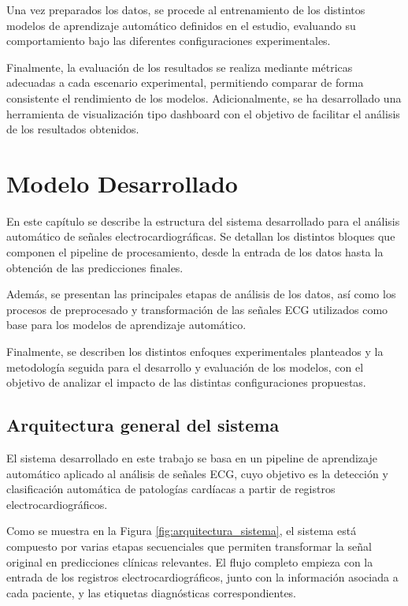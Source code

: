 \documentclass[12pt,a4paper,twoside]{book}
\begin{document}
Una vez preparados los datos, se procede al entrenamiento de los distintos modelos de aprendizaje automático definidos en el estudio, evaluando su comportamiento bajo las diferentes configuraciones experimentales.

Finalmente, la evaluación de los resultados se realiza mediante métricas adecuadas a cada escenario experimental, permitiendo comparar de forma consistente el rendimiento de los modelos. 
Adicionalmente, se ha desarrollado una herramienta de visualización tipo dashboard con el objetivo de facilitar el análisis de los resultados obtenidos. 


\chapter{Modelo Desarrollado}

En este capítulo se describe la estructura del sistema desarrollado para el análisis automático de señales electrocardiográficas. 
Se detallan los distintos bloques que componen el pipeline de procesamiento, desde la entrada de los datos hasta la obtención de las predicciones finales.

Además, se presentan las principales etapas de análisis de los datos, así como los procesos de preprocesado y transformación de las señales ECG utilizados como base para los modelos de aprendizaje automático.

Finalmente, se describen los distintos enfoques experimentales planteados y la metodología seguida para el desarrollo y evaluación de los modelos, con el objetivo de analizar el impacto de las distintas configuraciones propuestas.

\section{Arquitectura general del sistema}

El sistema desarrollado en este trabajo se basa en un pipeline de aprendizaje automático aplicado al análisis de señales ECG, cuyo objetivo es la detección y clasificación automática de patologías cardíacas a partir de registros electrocardiográficos.

Como se muestra en la Figura \ref{fig:arquitectura_sistema}, el sistema está compuesto por varias etapas secuenciales que permiten transformar la señal original en predicciones clínicas relevantes.
El flujo completo empieza con la entrada de los registros electrocardiográficos, junto con la información asociada a cada paciente, y las etiquetas diagnósticas correspondientes.
\end{document}
